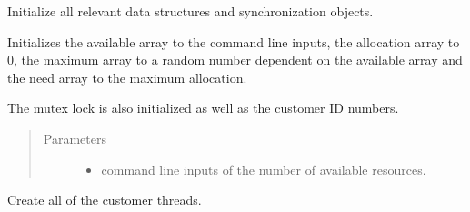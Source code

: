 \documentclass[letterpaper,10pt,english,openany,oneside]{sphinxmanual}
\begin{document}
\begin{fulllineitems}
Initialize all relevant data structures and synchronization objects.

Initializes the available array to the command line inputs, the
allocation array to 0, the maximum array to a random number dependent on the
available array and the need array to the maximum \sphinxhyphen{} allocation.

The mutex lock is also initialized as well as the customer ID numbers.
\begin{quote}\begin{description}
\item[{Parameters}] \leavevmode\begin{itemize}
\item {} 
 \textendash{} command line inputs of the number of available resources.

\end{itemize}

\end{description}\end{quote}

\end{fulllineitems}


\begin{fulllineitems}
\label{\detokenize{source_code:c.create_customers}}%
\pysigstartmultiline
{}%
\pysigstopmultiline
Create all of the customer threads.

\end{fulllineitems}
\end{document}
